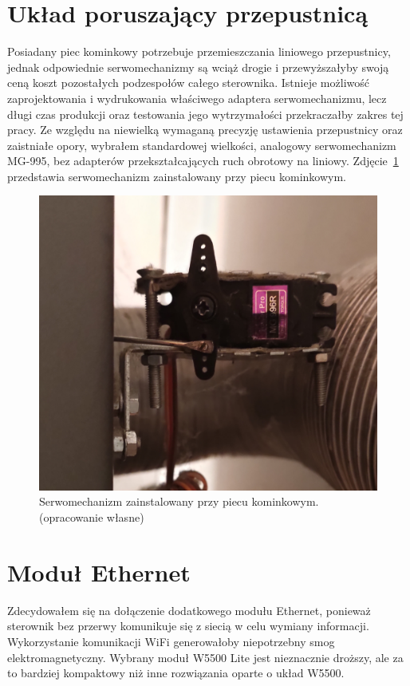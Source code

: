 \documentclass[11pt]{report}
\begin{document}
 \section{Układ poruszający przepustnicą} 
 Posiadany piec kominkowy potrzebuje przemieszczania liniowego przepustnicy, jednak odpowiednie serwomechanizmy są wciąż drogie i przewyższałyby swoją ceną koszt pozostałych podzespołów całego sterownika.
 Istnieje możliwość zaprojektowania i wydrukowania właściwego adaptera serwomechanizmu, lecz długi czas produkcji oraz testowania jego wytrzymałości przekraczałby zakres tej pracy.
  Ze względu na niewielką wymaganą precyzję ustawienia przepustnicy oraz zaistniałe opory, wybrałem standardowej wielkości, analogowy serwomechanizm MG-995, bez adapterów przekształcających ruch obrotowy na liniowy.
   Zdjęcie~\ref{fig:servo} przedstawia serwomechanizm zainstalowany przy piecu kominkowym.
    \begin{figure}[ht]
\centering
\includegraphics[width=0.8 \textwidth]{fig/servo.jpg}
\caption{Serwomechanizm zainstalowany przy piecu kominkowym. (opracowanie własne)}
\label{fig:servo}
\end{figure}
 
 \section{Moduł Ethernet}
 Zdecydowałem się na dołączenie dodatkowego modułu Ethernet, ponieważ sterownik bez przerwy komunikuje się z siecią w celu wymiany informacji. Wykorzystanie komunikacji WiFi generowałoby niepotrzebny smog elektromagnetyczny. Wybrany moduł W5500 Lite jest nieznacznie droższy, ale za to bardziej kompaktowy niż inne rozwiązania oparte o układ W5500.
 
\end{document}
